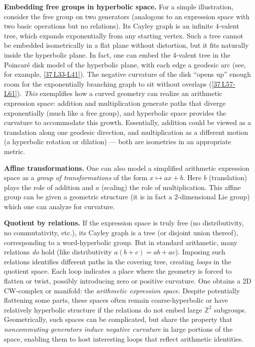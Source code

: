 \documentclass[11pt]{article}
\theoremstyle{remark}
\begin{document}
    \medskip

    {\bf Embedding free groups in hyperbolic space.} For a simple illustration, consider the free group on two generators (analogous to an expression space with two basic operations but no relations). Its Cayley graph is an infinite 4-valent tree, which expands exponentially from any starting vertex. Such a tree cannot be embedded isometrically in a flat plane without distortion, but it fits naturally inside the hyperbolic plane. In fact, one can embed the 4-valent tree in the Poincar\'e disk model of the hyperbolic plane, with each edge a geodesic arc (see, for example, \href{https://blog.geometryteachersguide.com/visually-representing-infinite-cayley-graphs-in-the-hyperbolic-plane/}{[37\,\textdagger L33-L41]}). The negative curvature of the disk ``opens up'' enough room for the exponentially branching graph to sit without overlaps (\href{https://blog.geometryteachersguide.com/visually-representing-infinite-cayley-graphs-in-the-hyperbolic-plane/}{[37\,\textdagger L57-L61]}). \emph{This} exemplifies how a curved geometry can realize an arithmetic expression space: addition and multiplication generate paths that diverge exponentially (much like a free group), and hyperbolic space provides the curvature to accommodate this growth. Essentially, addition could be viewed as a translation along one geodesic direction, and multiplication as a different motion (a hyperbolic rotation or dilation) --- both are isometries in an appropriate metric.

    \medskip

    {\bf Affine transformations.} One can also model a simplified arithmetic expression space as a \emph{group of transformations} of the form $x \mapsto ax + b$. Here $b$ (translation) plays the role of addition and $a$ (scaling) the role of multiplication. This affine group can be given a geometric structure (it is in fact a 2-dimensional Lie group) which one can analyze for curvature.

    \medskip

    {\bf Quotient by relations.} If the expression space is truly free (no distributivity, no commutativity, etc.), its Cayley graph is a tree (or disjoint union thereof), corresponding to a word-hyperbolic group. But in standard arithmetic, many relations \emph{do} hold (like distributivity $a(b+c) = ab + ac$). Imposing such relations identifies different paths in the covering tree, creating \emph{loops} in the quotient space. Each loop indicates a place where the geometry is forced to flatten or twist, possibly introducing zero or positive curvature. One obtains a 2D CW-complex or manifold: the \emph{arithmetic expression space}. Despite potentially flattening some parts, these spaces often remain coarse-hyperbolic or have relatively hyperbolic structure if the relations do not embed large $\mathbb{Z}^2$ subgroups. Geometrically, such spaces can be complicated, but share the property that \emph{noncommuting generators induce negative curvature} in large portions of the space, enabling them to host interesting loops that reflect arithmetic identities.
\end{document}
